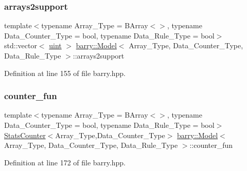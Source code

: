 \mbox{\label{classbarry_1_1_model_a9cd0e9c9d29df6637ab30ebe3daeeff7}} 
\subsubsection{\texorpdfstring{arrays2support}{arrays2support}}
{\footnotesize\ttfamily template$<$typename Array\+\_\+\+Type  = B\+Array$<$$>$, typename Data\+\_\+\+Counter\+\_\+\+Type  = bool, typename Data\+\_\+\+Rule\+\_\+\+Type  = bool$>$ \\
std\+::vector$<$ \hyperlink{namespacebarry_a11dfc53ddb4672278319aa04f1e09a6c}{uint} $>$ \hyperlink{classbarry_1_1_model}{barry\+::\+Model}$<$ Array\+\_\+\+Type, Data\+\_\+\+Counter\+\_\+\+Type, Data\+\_\+\+Rule\+\_\+\+Type $>$\+::arrays2support}



Definition at line 155 of file barry.\+hpp.

\mbox{\label{classbarry_1_1_model_ada40ca4ec8b21a3dbbe646edbfb1df45}} 
\subsubsection{\texorpdfstring{counter\+\_\+fun}{counter\_fun}}
{\footnotesize\ttfamily template$<$typename Array\+\_\+\+Type  = B\+Array$<$$>$, typename Data\+\_\+\+Counter\+\_\+\+Type  = bool, typename Data\+\_\+\+Rule\+\_\+\+Type  = bool$>$ \\
\hyperlink{classbarry_1_1_stats_counter}{Stats\+Counter}$<$Array\+\_\+\+Type,Data\+\_\+\+Counter\+\_\+\+Type$>$ \hyperlink{classbarry_1_1_model}{barry\+::\+Model}$<$ Array\+\_\+\+Type, Data\+\_\+\+Counter\+\_\+\+Type, Data\+\_\+\+Rule\+\_\+\+Type $>$\+::counter\+\_\+fun}



Definition at line 172 of file barry.\+hpp.

\mbox{\label{classbarry_1_1_model_aea013a7ac325ece7564e8ea9cdf441a2}} 
